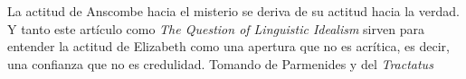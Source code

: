 La actitud de Anscombe hacia el misterio se deriva de su actitud hacia la verdad. Y tanto este artículo como \emph{The Question of Linguistic Idealism} sirven para entender la actitud de Elizabeth como una apertura que no es acrítica, es decir, una confianza que no es credulidad. Tomando de Parmenides y del \emph{Tractatus}





